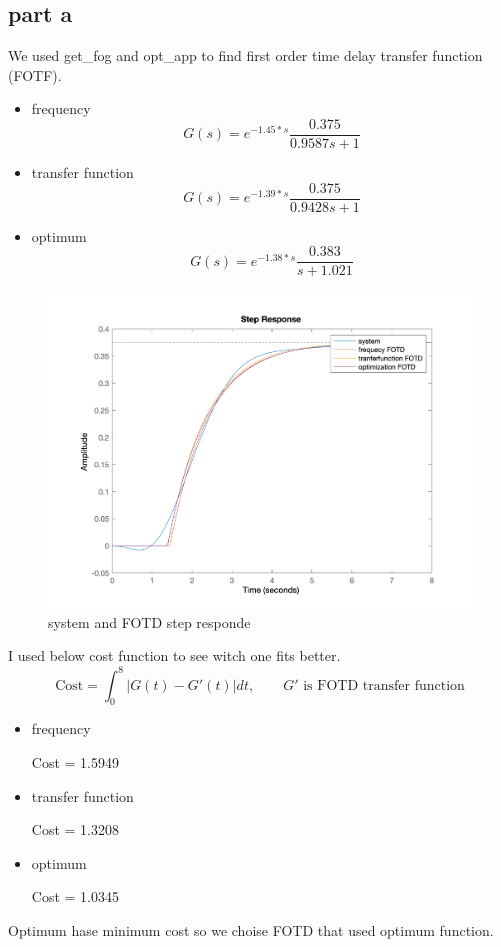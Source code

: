 \subsection{part a}

We used get\_fog and opt\_app to find first order time delay transfer function (FOTF).
\begin{itemize}
    \item frequency
    $$
    G(s) =  e^{-1.45*s} \dfrac{0.375}{0.9587s + 1}
    $$
    \item transfer function
    $$
    G(s) =  e^{-1.39*s} \dfrac{0.375}{0.9428s + 1}
    $$
    \item optimum
    $$
    G(s) =  e^{-1.38*s} \dfrac{0.383}{s + 1.021}
    $$
\end{itemize}
\begin{figure}[H]
    \caption{system and FOTD step responde}
    \centering
    \includegraphics[width=12cm]{../Figure/Q1/a/FOTD.png}
\end{figure}
I used below cost function to see witch one fits better.
$$
\text{Cost} = \int_{0}^{8} \vert G(t) - G'(t)\vert dt,\qquad \text{$G'$ is FOTD transfer function}
$$
\begin{itemize}
    \item frequency
    
    Cost = 1.5949
    \item transfer function
    
    Cost = 1.3208
    \item optimum
    
    Cost = 1.0345
\end{itemize}
Optimum hase minimum cost so we choise FOTD that used optimum function.
